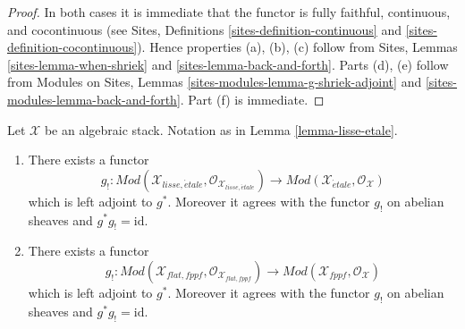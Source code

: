 \begin{proof}
In both cases it is immediate that the functor is fully faithful,
continuous, and cocontinuous (see
Sites, Definitions \ref{sites-definition-continuous} and
\ref{sites-definition-cocontinuous}).
Hence properties (a), (b), (c) follow from
Sites, Lemmas \ref{sites-lemma-when-shriek} and
\ref{sites-lemma-back-and-forth}.
Parts (d), (e) follow from
Modules on Sites, Lemmas \ref{sites-modules-lemma-g-shriek-adjoint} and
\ref{sites-modules-lemma-back-and-forth}.
Part (f) is immediate.
\end{proof}

\begin{lemma}
\label{lemma-lisse-etale-modules}
Let $\mathcal{X}$ be an algebraic stack. Notation as in
Lemma \ref{lemma-lisse-etale}.
\begin{enumerate}
\item There exists a functor
$$
g_! :
\textit{Mod}(\mathcal{X}_{lisse,\acute{e}tale},
\mathcal{O}_{\mathcal{X}_{lisse,\acute{e}tale}})
\longrightarrow
\textit{Mod}(\mathcal{X}_{\acute{e}tale}, \mathcal{O}_{\mathcal{X}})
$$
which is left adjoint to $g^*$. Moreover it agrees with the functor $g_!$
on abelian sheaves and $g^*g_! = \text{id}$.
\item There exists a functor
$$
g_! :
\textit{Mod}(\mathcal{X}_{flat,fppf},
\mathcal{O}_{\mathcal{X}_{flat,fppf}})
\longrightarrow
\textit{Mod}(\mathcal{X}_{fppf}, \mathcal{O}_{\mathcal{X}})
$$
which is left adjoint to $g^*$. Moreover it agrees with the functor $g_!$
on abelian sheaves and $g^*g_! = \text{id}$.
\end{enumerate}
\end{lemma}

